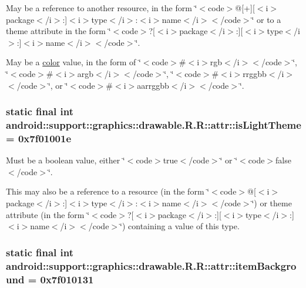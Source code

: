 May be a reference to another resource, in the form \char`\"{}$<$code$>$@\mbox{[}+\mbox{]}\mbox{[}$<$i$>$package$<$/i$>$:\mbox{]}$<$i$>$type$<$/i$>$:$<$i$>$name$<$/i$>$$<$/code$>$\char`\"{} or to a theme attribute in the form \char`\"{}$<$code$>$?\mbox{[}$<$i$>$package$<$/i$>$:\mbox{]}\mbox{[}$<$i$>$type$<$/i$>$:\mbox{]}$<$i$>$name$<$/i$>$$<$/code$>$\char`\"{}. 

May be a \hyperlink{classandroid_1_1support_1_1graphics_1_1drawable_1_1_r_1_1color}{color} value, in the form of \char`\"{}$<$code$>$\#$<$i$>$rgb$<$/i$>$$<$/code$>$\char`\"{}, \char`\"{}$<$code$>$\#$<$i$>$argb$<$/i$>$$<$/code$>$\char`\"{}, \char`\"{}$<$code$>$\#$<$i$>$rrggbb$<$/i$>$$<$/code$>$\char`\"{}, or \char`\"{}$<$code$>$\#$<$i$>$aarrggbb$<$/i$>$$<$/code$>$\char`\"{}. \hypertarget{classandroid_1_1support_1_1graphics_1_1drawable_1_1_r_1_1attr_707e904839e4829119fbd7cf44372683}{
\subsubsection[{isLightTheme}]{\setlength{\rightskip}{0pt plus 5cm}static final int android::support::graphics::drawable.R.R::attr::isLightTheme = 0x7f01001e}}
\label{classandroid_1_1support_1_1graphics_1_1drawable_1_1_r_1_1attr_707e904839e4829119fbd7cf44372683}


Must be a boolean value, either \char`\"{}$<$code$>$true$<$/code$>$\char`\"{} or \char`\"{}$<$code$>$false$<$/code$>$\char`\"{}. 

This may also be a reference to a resource (in the form \char`\"{}$<$code$>$@\mbox{[}$<$i$>$package$<$/i$>$:\mbox{]}$<$i$>$type$<$/i$>$:$<$i$>$name$<$/i$>$$<$/code$>$\char`\"{}) or theme attribute (in the form \char`\"{}$<$code$>$?\mbox{[}$<$i$>$package$<$/i$>$:\mbox{]}\mbox{[}$<$i$>$type$<$/i$>$:\mbox{]}$<$i$>$name$<$/i$>$$<$/code$>$\char`\"{}) containing a value of this type. \hypertarget{classandroid_1_1support_1_1graphics_1_1drawable_1_1_r_1_1attr_b7348c63abaadd05cfd3efecac6fa91f}{
\subsubsection[{itemBackground}]{\setlength{\rightskip}{0pt plus 5cm}static final int android::support::graphics::drawable.R.R::attr::itemBackground = 0x7f010131}}
\label{classandroid_1_1support_1_1graphics_1_1drawable_1_1_r_1_1attr_b7348c63abaadd05cfd3efecac6fa91f}


